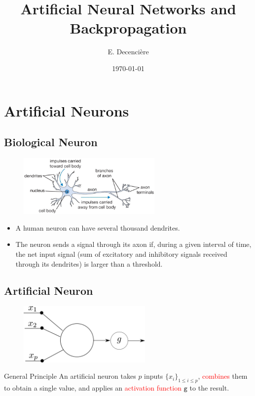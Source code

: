 \documentclass{book}
\title{Artificial Neural Networks and Backpropagation}
\author{E. Decencière}
\date{\today}
\newcommand{\act}{\texttt{g}}%
\newcommand{\alert}[1]{\textcolor{red}{#1}}
\begin{document}
\maketitle
\tableofcontents

\chapter{Artificial Neurons}

\section{Biological Neuron}

\begin{figure}[h]
    \centering
    \includegraphics[height=3cm]{neuron}
\end{figure}

\begin{itemize}
\item A human neuron can have several thousand dendrites.
\item The neuron sends a signal through its axon if, during a given interval of time, the net input signal (sum of excitatory and inhibitory signals received through its dendrites) is larger than a threshold.
\end{itemize}

\section{Artificial Neuron}

\begin{figure}[h]
    \centering
    \includegraphics[height=3cm]{neurone_general}
\end{figure}

\begin{myblock}{General Principle}
An artificial neuron takes $p$ inputs $\{x_i\}_{1 \leq i \leq p}$, \alert{combines} them to obtain a single value, and applies an \alert{activation function} $\act$ to the result.
\end{myblock}
\end{document}
